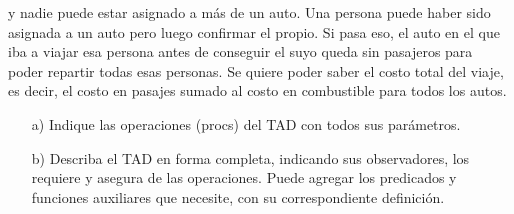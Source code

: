 \documentclass{article}
\begin{document}
y nadie puede estar asignado a m\'as de un auto. Una persona puede haber sido asignada a un auto pero luego confirmar el
propio. Si pasa eso, el auto en el que iba a viajar esa persona antes de conseguir el suyo queda sin pasajeros para poder
repartir todas esas personas.
Se quiere poder saber el costo total del viaje, es decir, el costo en pasajes sumado al costo en combustible para todos los
autos.
\begin{itemize}
    \item[a)] Indique las operaciones (procs) del TAD con todos sus par\'ametros.
    \item[b)] Describa el TAD en forma completa, indicando sus observadores, los requiere y asegura de las operaciones. Puede agregar los predicados y funciones auxiliares que necesite, con su correspondiente definici\'on.
\end{itemize}
\end{document}

